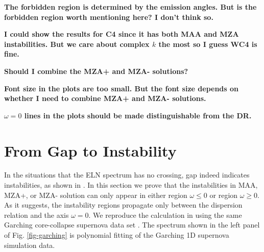 \documentclass[%
preprint,
 amsmath,amssymb,
 aps,
 prd
]{revtex4-1}
\begin{document}
{\color{red}\bf The forbidden region is determined by the emission angles. But is the forbidden region worth mentioning here? I don't think so.}

{\color{red}\bf I could show the results for C4 since it has both MAA and MZA instabilities. But we care about complex $k$ the most so I guess WC4 is fine.}

{\color{red}\bf Should I combine the MZA+ and MZA- solutions? }

{\color{red}\bf Font size in the plots are too small. But the font size depends on whether I need to combine MZA+ and MZA- solutions. }

{\color{red}\bf $\omega=0$ lines in the plots should be made distinguishable from the DR. }



\section{\label{sec-gap-to-instability}From Gap to Instability}

In the situations that the ELN spectrum has no crossing, gap indeed indicates instabilities, as shown in . In this section we prove that the instabilities in MAA, MZA+, or MZA- solution can only appear in either region $\omega\leq 0$ or region $\omega \geq 0$. As it suggests, the instability regions propagate only between the dispersion relation and the axis $\omega=0$. We reproduce the calculation in  using the same Garching core-collapse supernova data set \cite{garching-ccsn-data}. The spectrum shown in the left panel of Fig. \ref{fig-garching} is polynomial fitting of the Garching 1D supernova simulation data.
\end{document}
